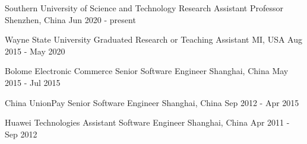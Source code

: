 

\begin{mcventries}

  \mcventry
    {Southern University of Science and Technology} %
    {Research Assistant Professor} %
    {Shenzhen, China} %
    {Jun 2020 - present} %
    {
    }
    \vspace{-10pt}

  \mcventry
    {Wayne State University} %
    {Graduated Research or Teaching Assistant} %
    {MI, USA} %
    {Aug 2015 - May 2020} %
    {
    }
    \vspace{-10pt}

  \mcventry
    {Bolome Electronic Commerce} %
    {Senior Software Engineer} %
    {Shanghai, China} %
    {May 2015 - Jul 2015} %
    {
    }
    \vspace{-10pt}

  \mcventry
    {China UnionPay} %
    {Senior Software Engineer} %
    {Shanghai, China} %
    {Sep 2012 - Apr 2015} %
    {
    }
    \vspace{-10pt}

  \mcventry
    {Huawei Technologies} %
    {Assistant Software Engineer} %
    {Shanghai, China} %
    {Apr 2011 - Sep 2012} %
    {
    }
    \vspace{-10pt}

\end{mcventries}
